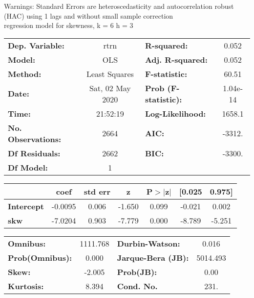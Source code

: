 Warnings: \newline
 [1] Standard Errors are heteroscedasticity and autocorrelation robust (HAC) using 1 lags and without small sample correction\\ 

regression model for skewness, k = 6 h = 3\begin{center}
\begin{tabular}{lclc}
\toprule
\textbf{Dep. Variable:}    &       rtrn       & \textbf{  R-squared:         } &     0.052   \\
\textbf{Model:}            &       OLS        & \textbf{  Adj. R-squared:    } &     0.052   \\
\textbf{Method:}           &  Least Squares   & \textbf{  F-statistic:       } &     60.51   \\
\textbf{Date:}             & Sat, 02 May 2020 & \textbf{  Prob (F-statistic):} &  1.04e-14   \\
\textbf{Time:}             &     21:52:19     & \textbf{  Log-Likelihood:    } &    1658.1   \\
\textbf{No. Observations:} &        2664      & \textbf{  AIC:               } &    -3312.   \\
\textbf{Df Residuals:}     &        2662      & \textbf{  BIC:               } &    -3300.   \\
\textbf{Df Model:}         &           1      & \textbf{                     } &             \\
\bottomrule
\end{tabular}
\begin{tabular}{lcccccc}
                   & \textbf{coef} & \textbf{std err} & \textbf{z} & \textbf{P$> |$z$|$} & \textbf{[0.025} & \textbf{0.975]}  \\
\midrule
\textbf{Intercept} &      -0.0095  &        0.006     &    -1.650  &         0.099        &       -0.021    &        0.002     \\
\textbf{skw}       &      -7.0204  &        0.903     &    -7.779  &         0.000        &       -8.789    &       -5.251     \\
\bottomrule
\end{tabular}
\begin{tabular}{lclc}
\textbf{Omnibus:}       & 1111.768 & \textbf{  Durbin-Watson:     } &    0.016  \\
\textbf{Prob(Omnibus):} &   0.000  & \textbf{  Jarque-Bera (JB):  } & 5014.493  \\
\textbf{Skew:}          &  -2.005  & \textbf{  Prob(JB):          } &     0.00  \\
\textbf{Kurtosis:}      &   8.394  & \textbf{  Cond. No.          } &     231.  \\
\bottomrule
\end{tabular}
\end{center}

